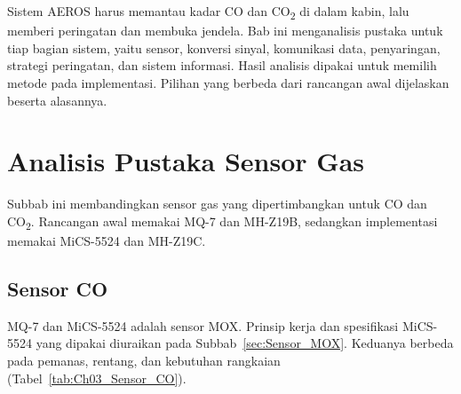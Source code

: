 Sistem AEROS harus memantau kadar CO dan CO\textsubscript{2} di dalam kabin, lalu memberi peringatan dan membuka jendela. Bab ini menganalisis pustaka untuk tiap bagian sistem, yaitu sensor, konversi sinyal, komunikasi data, penyaringan, strategi peringatan, dan sistem informasi. Hasil analisis dipakai untuk memilih metode pada implementasi. Pilihan yang berbeda dari rancangan awal dijelaskan beserta alasannya.

\section{Analisis Pustaka Sensor Gas}
\label{sec:Analisis_Pustaka_Sensor_Gas}

    Subbab ini membandingkan sensor gas yang dipertimbangkan untuk CO dan CO\textsubscript{2}. Rancangan awal memakai MQ-7 dan MH-Z19B, sedangkan implementasi memakai MiCS-5524 dan MH-Z19C.

    \subsection{Sensor CO}
    \label{sec:Analisis_Sensor_CO}

    MQ-7 dan MiCS-5524 adalah sensor MOX. Prinsip kerja dan spesifikasi MiCS-5524 yang dipakai diuraikan pada Subbab~\ref{sec:Sensor_MOX}. Keduanya berbeda pada pemanas, rentang, dan kebutuhan rangkaian (Tabel~\ref{tab:Ch03_Sensor_CO}).

